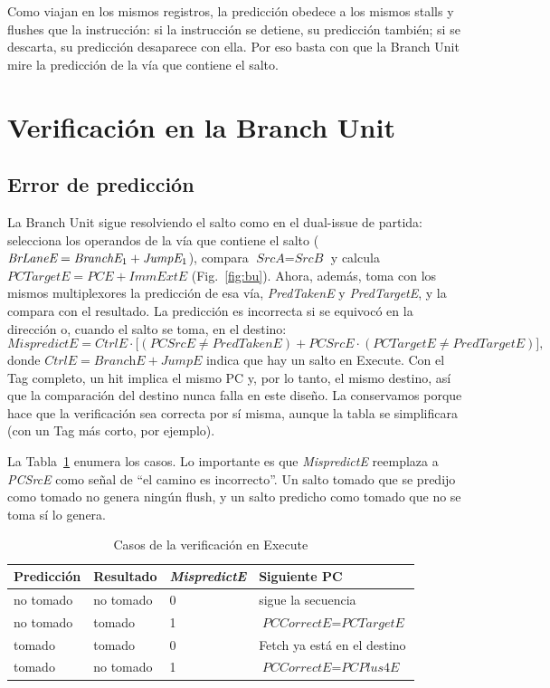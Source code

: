 \documentclass[11pt,a4paper]{article}
\newcommand{\sig}[1]{\textit{#1}}
\newcommand{\sigk}[2]{\textit{#1}\textsubscript{#2}}
\begin{document}
Como viajan en los mismos registros, la predicción obedece a los mismos stalls y flushes
que la instrucción: si la instrucción se detiene, su predicción también; si se descarta,
su predicción desaparece con ella. Por eso basta con que la Branch Unit mire la
predicción de la vía que contiene el salto.

\section{Verificación en la Branch Unit}
\label{sec:verify}

\subsection{Error de predicción}

La Branch Unit sigue resolviendo el salto como en el dual-issue de partida: selecciona los operandos
de la vía que contiene el salto ($\sig{BrLaneE} = \sigk{BranchE}{1} + \sigk{JumpE}{1}$),
compara $\sig{SrcA} = \sig{SrcB}$ y calcula $\sig{PCTargetE} = \sig{PCE} + \sig{ImmExtE}$
(Fig.~\ref{fig:bu}). Ahora, además, toma con los mismos multiplexores la predicción de esa
vía, \sig{PredTakenE} y \sig{PredTargetE}, y la compara con el resultado. La predicción es
incorrecta si se equivocó en la dirección o, cuando el salto se toma, en el destino:
\[
  \sig{MispredictE} = \sig{CtrlE}\cdot\big[(\sig{PCSrcE} \neq \sig{PredTakenE}) +
  \sig{PCSrcE}\cdot(\sig{PCTargetE} \neq \sig{PredTargetE})\big],
\]
donde $\sig{CtrlE} = \sig{BranchE} + \sig{JumpE}$ indica que hay un salto en Execute. Con
el Tag completo, un hit implica el mismo PC y, por lo tanto, el mismo destino, así que la
comparación del destino nunca falla en este diseño. La conservamos porque hace que la
verificación sea correcta por sí misma, aunque la tabla se simplificara (con un Tag más
corto, por ejemplo).

La Tabla~\ref{tab:cases} enumera los casos. Lo importante es que \sig{MispredictE}
reemplaza a \sig{PCSrcE} como señal de ``el camino es incorrecto''. Un salto tomado que se
predijo como tomado no genera ningún flush, y un salto predicho como tomado que no se toma
sí lo genera.

\begin{table}[htbp]
\centering\small
\caption{Casos de la verificación en Execute}
\label{tab:cases}
\begin{tabular}{@{}llll@{}}
\toprule
Predicción & Resultado & \sig{MispredictE} & Siguiente PC \\
\midrule
no tomado & no tomado & 0 & sigue la secuencia \\
no tomado & tomado    & 1 & $\sig{PCCorrectE} = \sig{PCTargetE}$ \\
tomado    & tomado    & 0 & Fetch ya está en el destino \\
tomado    & no tomado & 1 & $\sig{PCCorrectE} = \sig{PCPlus4E}$ \\
\bottomrule
\end{tabular}
\end{table}
\end{document}
